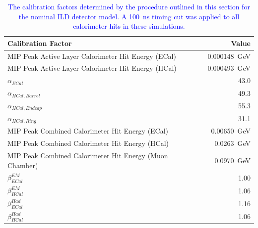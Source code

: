 \begin{table}[h!]
\centering
\begin{tabular}{l r}
\hline
Calibration Factor & Value \\
\hline
MIP Peak Active Layer Calorimeter Hit Energy (ECal) & 0.000148~GeV \\
MIP Peak Active Layer Calorimeter Hit Energy (HCal) & 0.000493~GeV \\
$\alpha_{ECal}$ & 43.0 \\
$\alpha_{HCal, Barrel}$ & 49.3 \\
$\alpha_{HCal, Endcap}$ & 55.3 \\
$\alpha_{HCal, Ring}$ & 31.1 \\
MIP Peak Combined Calorimeter Hit Energy (ECal) & 0.00650~GeV \\
MIP Peak Combined Calorimeter Hit Energy (HCal) & 0.0263~GeV \\
MIP Peak Combined Calorimeter Hit Energy (Muon Chamber) & 0.0970~GeV \\
$\beta^{EM}_{ECal}$ & 1.00 \\
$\beta^{EM}_{HCal}$ & 1.06 \\
$\beta^{Had}_{ECal}$ & 1.16 \\
$\beta^{Had}_{HCal}$ & 1.06 \\
\end{tabular}
\caption[\textcolor{blue}{The calibration factors determined by the procedure outlined in this section for the nominal ILD detector model.  A 100~ns timing cut was applied to all calorimeter hits in these simulations.}]{\textcolor{blue}{The calibration factors determined by the procedure outlined in this section for the nominal ILD detector model.  A 100~ns timing cut was applied to all calorimeter hits in these simulations.}}
\label{table:scenario}
\end{table}


